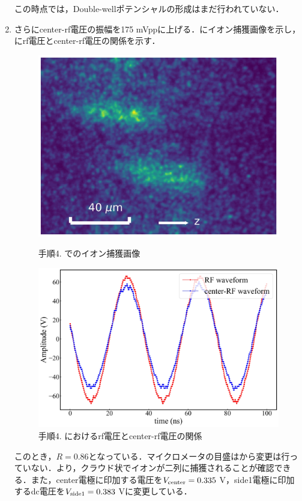 \begin{enumerate}
この時点では，Double-wellポテンシャルの形成はまだ行われていない．

\item さらにcenter-rf電圧の振幅を175 mVppに上げる．にイオン捕獲画像を示し，にrf電圧とcenter-rf電圧の関係を示す．

\begin{figure}[h]
	\begin{minipage}{0.48\linewidth}
	\begin{center}
		\includegraphics[width = 0.6\columnwidth]{./methods/figure/4_2D.jpg}
		\caption{手順4. でのイオン捕獲画像}
		\label{fig:4_2D}
	\end{center}
	\end{minipage}
	\begin{minipage}{0.48\linewidth}
		\begin{center}
			\includegraphics[width = 0.9\columnwidth]{./methods/figure/4_2D_wave.jpg}
			\caption{手順4. におけるrf電圧とcenter-rf電圧の関係}
			\label{fig:4_2D_wave}
		\end{center}
	\end{minipage}
\end{figure}

このとき，$R=0.86$となっている．マイクロメータの目盛はから変更は行っていない．より，クラウド状でイオンが二列に捕獲されることが確認できる．また，center電極に印加する電圧を$V_{\rm center} = 0.335$ V，side1電極に印加するdc電圧を$V_{\rm side1} = 0.383$ Vに変更している．


\end{enumerate}
